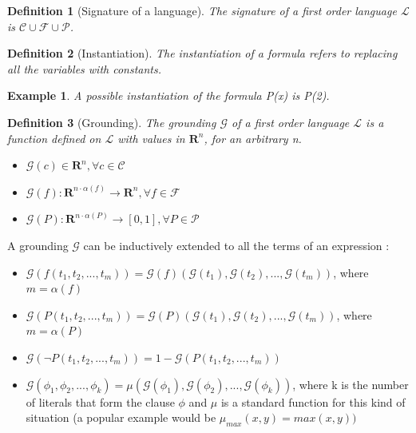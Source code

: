 \documentclass{article}
\newtheorem{definition}{Definition}[section]
\newtheorem{example}{Example}[section]
\begin{document}
\begin{definition}[Signature of a language]
The signature of a first order language $\mathcal{L}$ is $\mathcal{C} \cup \mathcal{F} \cup \mathcal{P}$. \cite{FOL}
\end{definition}

\begin{definition}[Instantiation]
The instantiation of a formula refers to replacing all the variables with constants. \cite{LTN}
\end{definition}

\begin{example}
A possible instantiation of the formula P(x) is P(2).
\end{example}

\begin{definition}[Grounding]
The grounding $\mathcal{G}$ of a first order language $\mathcal{L}$ is a function defined on $\mathcal{L}$ with values in $\mathbf{R}^n$, for an arbitrary n. \cite{LTN}
\begin{itemize}
	\item $\mathcal{G}(c) \in \mathbf{R}^n, \forall c \in \mathcal{C}$
	\item $\mathcal{G}(f): \mathbf{R}^{n \cdot \alpha (f)} \rightarrow \mathbf{R}^n, \forall f \in \mathcal{F}$
	\item $\mathcal{G}(P): \mathbf{R}^{n \cdot \alpha (P)} \rightarrow [0, 1], \forall P \in \mathcal{P}$
\end{itemize}
\end{definition}

A grounding $\mathcal{G}$ can be inductively extended to all the terms of an expression \cite{LTN}:\\
\begin{itemize}
	\item $\mathcal{G}(f(t_1, t_2, ..., t_m)) = \mathcal{G}(f)(\mathcal{G}(t_1), \mathcal{G}(t_2), ..., \mathcal{G}(t_m))$, where $m = \alpha(f)$
	\item $\mathcal{G}(P(t_1, t_2, ..., t_m)) = \mathcal{G}(P)(\mathcal{G}(t_1), \mathcal{G}(t_2), ..., \mathcal{G}(t_m))$, where$m =\alpha(P)$
	\item $\mathcal{G}(\neg P(t_1, t_2, ..., t_m)) = 1 - \mathcal{G}(P(t_1, t_2, ..., t_m))$
	\item $\mathcal{G}(\phi_1, \phi_2, ..., \phi_k) = \mu(\mathcal{G}(\phi_1), \mathcal{G}(\phi_2), ..., \mathcal{G}(\phi_k))$, where k is the number of literals that form the clause $\phi$ and $\mu$ is a standard function for this kind of situation (a popular example would be $\mu_{max}(x, y) = max(x, y))$
\end{itemize}
\end{document}
